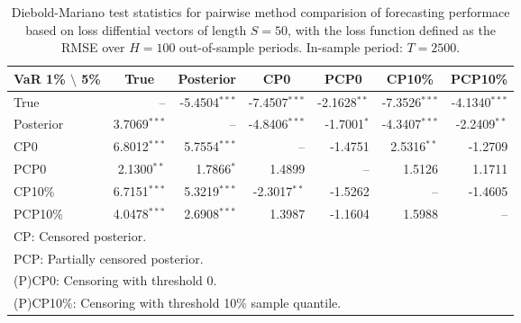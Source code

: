 { \renewcommand{\arraystretch}{1.2} 
\begin{table} 
\center 
\begin{tabular}{l | rrr rrr} 
VaR 1\% $\setminus$ 5\% & \multicolumn{1}{c}{True} & \multicolumn{1}{c}{Posterior} & \multicolumn{1}{c}{CP0} & \multicolumn{1}{c}{PCP0} & \multicolumn{1}{c}{CP10\%} & \multicolumn{1}{c}{PCP10\%} \\ \hline 
True &    --\phantom{$^{***}$} & -5.4504$^{***}$ & -7.4507$^{***}$ & -2.1628$^{**}$\phantom{$^{*}$} & -7.3526$^{***}$ & -4.1340$^{***}$  \\ 
Posterior & 3.7069$^{***}$ &    --\phantom{$^{***}$} & -4.8406$^{***}$ & -1.7001$^{*}$\phantom{$^{**}$} & -4.3407$^{***}$ & -2.2409$^{**}$\phantom{$^{*}$}  \\ 
CP0 & 6.8012$^{***}$ & 5.7554$^{***}$ &    --\phantom{$^{***}$} & -1.4751\phantom{$^{***}$} & 2.5316$^{**}$\phantom{$^{*}$} & -1.2709\phantom{$^{***}$}  \\ 
PCP0 & 2.1300$^{**}$\phantom{$^{*}$} & 1.7866$^{*}$\phantom{$^{**}$} & 1.4899\phantom{$^{***}$} &    --\phantom{$^{***}$} & 1.5126\phantom{$^{***}$} & 1.1711\phantom{$^{***}$}  \\ 
CP10\% & 6.7151$^{***}$ & 5.3219$^{***}$ & -2.3017$^{**}$\phantom{$^{*}$} & -1.5262\phantom{$^{***}$} &    --\phantom{$^{***}$} & -1.4605\phantom{$^{***}$}  \\ 
PCP10\% & 4.0478$^{***}$ & 2.6908$^{***}$ & 1.3987\phantom{$^{***}$} & -1.1604\phantom{$^{***}$} & 1.5988\phantom{$^{***}$} &    --\phantom{$^{***}$}  \\ 
\hline 
\multicolumn{7}{l}{\footnotesize{CP: Censored posterior.}}  \\ 
\multicolumn{7}{l}{\footnotesize{PCP: Partially censored posterior.}} \\ 
\multicolumn{7}{l}{\footnotesize{(P)CP0: Censoring with threshold 0.}} \\ 
\multicolumn{7}{l}{\footnotesize{(P)CP10\%: Censoring with threshold 10\% sample quantile.}}  \\ 
\end{tabular}
 \caption{Diebold-Mariano test statistics for  pairwise method comparision of forecasting performace based on loss diffential vectors of length $S = 50$, with the loss function defined as the RMSE over $H=100$ out-of-sample periods. In-sample period: $T = 2500$.} 
\label{tab:garch11_DM_T_2500}  
\end{table}
}